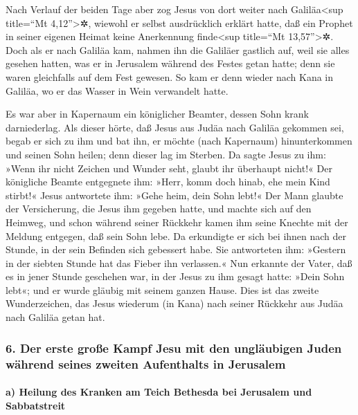  Nach Verlauf der beiden Tage aber zog Jesus von dort
weiter nach Galiläa\textless sup title=``Mt 4,12''\textgreater✲,
 wiewohl er selbst ausdrücklich erklärt hatte, daß ein
Prophet in seiner eigenen Heimat keine Anerkennung finde\textless sup
title=``Mt 13,57''\textgreater✲.  Doch als er nach
Galiläa kam, nahmen ihn die Galiläer gastlich auf, weil sie alles
gesehen hatten, was er in Jerusalem während des Festes getan hatte; denn
sie waren gleichfalls auf dem Fest gewesen.  So kam er
denn wieder nach Kana in Galiläa, wo er das Wasser in Wein verwandelt
hatte.

Es war aber in Kapernaum ein königlicher Beamter, dessen Sohn krank
darniederlag.  Als dieser hörte, daß Jesus aus Judäa nach
Galiläa gekommen sei, begab er sich zu ihm und bat ihn, er möchte (nach
Kapernaum) hinunterkommen und seinen Sohn heilen; denn dieser lag im
Sterben.  Da sagte Jesus zu ihm: »Wenn ihr nicht Zeichen
und Wunder seht, glaubt ihr überhaupt nicht!«  Der
königliche Beamte entgegnete ihm: »Herr, komm doch hinab, ehe mein Kind
stirbt!«  Jesus antwortete ihm: »Gehe heim, dein Sohn
lebt!« Der Mann glaubte der Versicherung, die Jesus ihm gegeben hatte,
und machte sich auf den Heimweg,  und schon während
seiner Rückkehr kamen ihm seine Knechte mit der Meldung entgegen, daß
sein Sohn lebe.  Da erkundigte er sich bei ihnen nach der
Stunde, in der sein Befinden sich gebessert habe. Sie antworteten ihm:
»Gestern in der siebten Stunde hat das Fieber ihn verlassen.«
 Nun erkannte der Vater, daß es in jener Stunde geschehen
war, in der Jesus zu ihm gesagt hatte: »Dein Sohn lebt«; und er wurde
gläubig mit seinem ganzen Hause.  Dies ist das zweite
Wunderzeichen, das Jesus wiederum (in Kana) nach seiner Rückkehr aus
Judäa nach Galiläa getan hat.

\hypertarget{der-erste-grouxdfe-kampf-jesu-mit-den-ungluxe4ubigen-juden-wuxe4hrend-seines-zweiten-aufenthalts-in-jerusalem}{%
\subsubsection{6. Der erste große Kampf Jesu mit den ungläubigen Juden
während seines zweiten Aufenthalts in
Jerusalem}\label{der-erste-grouxdfe-kampf-jesu-mit-den-ungluxe4ubigen-juden-wuxe4hrend-seines-zweiten-aufenthalts-in-jerusalem}}

\hypertarget{a-heilung-des-kranken-am-teich-bethesda-bei-jerusalem-und-sabbatstreit}{%
\paragraph{a) Heilung des Kranken am Teich Bethesda bei Jerusalem und
Sabbatstreit}\label{a-heilung-des-kranken-am-teich-bethesda-bei-jerusalem-und-sabbatstreit}}


